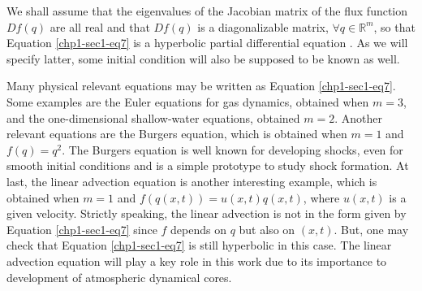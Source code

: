 We shall assume that the eigenvalues of the Jacobian matrix of the flux function
$D{f}(q)$ are all real and that $D{f}(q)$ is a diagonalizable matrix,
$\forall q \in \mathbb{R}^m$, so that Equation \eqref{chp1-sec1-eq7}
is a hyperbolic partial differential equation \citep{leveque:1990}. As we will 
specify latter, some initial condition will also be supposed to be known as well.

Many physical relevant equations may be written as Equation \eqref{chp1-sec1-eq7}.
Some examples are the Euler equations for gas dynamics, obtained when $m = 3$,
and the one-dimensional shallow-water equations, obtained $m = 2$.
Another relevant equations are the Burgers equation, which is obtained when
$m = 1$ and $f(q) = q^2$. The Burgers equation is well known for developing shocks,
even for smooth initial conditions and is a simple prototype to study shock formation.
At last, the linear advection equation is another interesting example, which is obtained
when $m = 1$ and $f(q(x,t)) = u(x,t)q(x,t)$, where $u(x,t)$ is a given velocity.
Strictly speaking, the linear advection is not in the form given by Equation
\eqref{chp1-sec1-eq7} since $f$ depends on $q$ but also on $(x,t)$.
But, one may check that Equation \eqref{chp1-sec1-eq7} is still hyperbolic
in this case. The linear advection equation will play a key role in this work due to its importance
to development of atmospheric dynamical cores.


